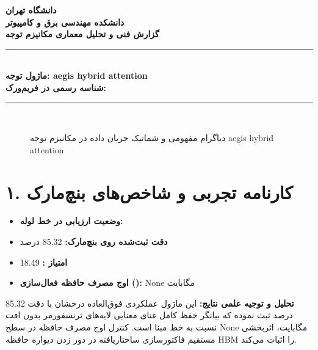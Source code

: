 \documentclass[12pt,a4paper]{article}
\begin{document}
\begin{center}
{\Large\bfseries دانشگاه تهران}\\[0.2cm]
{\large\bfseries دانشکده مهندسی برق و کامپیوتر}\\[0.2cm]
{\large\bfseries گزارش فنی و تحلیل معماری مکانیزم توجه}\\[0.5cm]
\rule{\linewidth}{1pt}\\[0.3cm]
{\LARGE\bfseries ماژول توجه: aegis hybrid attention}\\[0.2cm]
{\large \textbf{شناسه رسمی در فریم‌ورک:} }\\[0.2cm]
\rule{\linewidth}{1pt}\\[0.5cm]
\end{center}

\begin{figure}[H]
\centering
{}
\caption{دیاگرام مفهومی و شماتیک جریان داده در مکانیزم توجه aegis hybrid attention}
\end{figure}

\section*{۱. کارنامه تجربی و شاخص‌های بنچ‌مارک}
\begin{itemize}
\item \textbf{وضعیت ارزیابی در خط لوله:} 
\item \textbf{دقت ثبت‌شده روی بنچ‌مارک:} 85.32 درصد
\item \textbf{امتیاز :} 18.49
\item \textbf{اوج مصرف حافظه فعال‌سازی ():} None مگابایت
\end{itemize}
\textbf{تحلیل و توجیه علمی نتایج:} این ماژول عملکردی فوق‌العاده درخشان با دقت 85.32 درصد ثبت نموده که بیانگر حفظ کامل غنای معنایی لایه‌های ترنسفورمر بدون افت نسبت به خط مبنا است. کنترل اوج مصرف حافظه در سطح None مگابایت، اثربخشی مستقیم فاکتورسازی ساختاریافته در دور زدن دیواره حافظه HBM را اثبات می‌کند.
\end{document}
